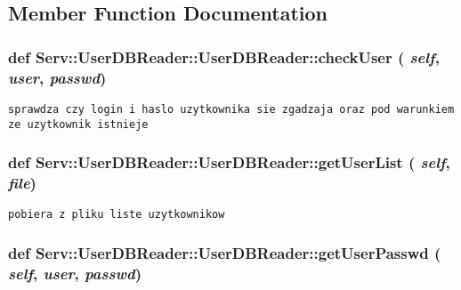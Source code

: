 \subsection{Member Function Documentation}
\hypertarget{class_serv_1_1_user_d_b_reader_1_1_user_d_b_reader_1fa47b601f3968090cf56b959f50ca94}{
\subsubsection[{checkUser}]{\setlength{\rightskip}{0pt plus 5cm}def Serv::UserDBReader::UserDBReader::checkUser ( {\em self}, \/   {\em user}, \/   {\em passwd})}}
\label{class_serv_1_1_user_d_b_reader_1_1_user_d_b_reader_1fa47b601f3968090cf56b959f50ca94}




\footnotesize\begin{verbatim}sprawdza czy login i haslo uzytkownika sie zgadzaja oraz pod warunkiem ze uzytkownik istnieje

\end{verbatim}
\normalsize
 \hypertarget{class_serv_1_1_user_d_b_reader_1_1_user_d_b_reader_84890922ae8efd8ecec178874ec296f6}{
\subsubsection[{getUserList}]{\setlength{\rightskip}{0pt plus 5cm}def Serv::UserDBReader::UserDBReader::getUserList ( {\em self}, \/   {\em file})}}
\label{class_serv_1_1_user_d_b_reader_1_1_user_d_b_reader_84890922ae8efd8ecec178874ec296f6}




\footnotesize\begin{verbatim}pobiera z pliku liste uzytkownikow

\end{verbatim}
\normalsize
 \hypertarget{class_serv_1_1_user_d_b_reader_1_1_user_d_b_reader_d77c35dbbb9ddf154ab8809463a254c0}{
\subsubsection[{getUserPasswd}]{\setlength{\rightskip}{0pt plus 5cm}def Serv::UserDBReader::UserDBReader::getUserPasswd ( {\em self}, \/   {\em user}, \/   {\em passwd})}}
\label{class_serv_1_1_user_d_b_reader_1_1_user_d_b_reader_d77c35dbbb9ddf154ab8809463a254c0}




